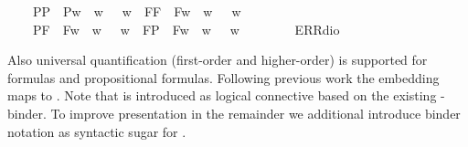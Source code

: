 \begin{isabellebody}
\ \ \ \ {\isacharparenleft}P{\isacharparenleft}{\isasymalpha}{\isacharparenright}{\isacharcomma}P{\isacharparenleft}{\isasymbeta}{\isacharparenright}{\isacharparenright}\ {\isasymRightarrow}\ P{\isacharparenleft}{\isasymlambda}w{\isachardot}\ {\isasymalpha}\ w\ {\isasymlongrightarrow}\ {\isasymbeta}\ w{\isacharparenright}\ {\isacharbar}\ {\isacharparenleft}F{\isacharparenleft}{\isasymalpha}{\isacharparenright}{\isacharcomma}F{\isacharparenleft}{\isasymbeta}{\isacharparenright}{\isacharparenright}\ {\isasymRightarrow}\ F{\isacharparenleft}{\isasymlambda}w{\isachardot}\ {\isasymalpha}\ w\ {\isasymlongrightarrow}\ {\isasymbeta}\ w{\isacharparenright}\ {\isacharbar}\ \isanewline
\ \ \ \ {\isacharparenleft}P{\isacharparenleft}{\isasymalpha}{\isacharparenright}{\isacharcomma}F{\isacharparenleft}{\isasymbeta}{\isacharparenright}{\isacharparenright}\ {\isasymRightarrow}\ F{\isacharparenleft}{\isasymlambda}w{\isachardot}\ {\isasymalpha}\ w\ {\isasymlongrightarrow}\ {\isasymbeta}\ w{\isacharparenright}\ {\isacharbar}\ {\isacharparenleft}F{\isacharparenleft}{\isasymalpha}{\isacharparenright}{\isacharcomma}P{\isacharparenleft}{\isasymbeta}{\isacharparenright}{\isacharparenright}\ {\isasymRightarrow}\ F{\isacharparenleft}{\isasymlambda}w{\isachardot}\ {\isasymalpha}\ w\ {\isasymlongrightarrow}\ {\isasymbeta}\ w{\isacharparenright}\ {\isacharbar}\ \isanewline
\ \ \ \ {\isacharunderscore}\ {\isasymRightarrow}\ ERR{\isacharparenleft}dio{\isacharparenright}{\isachardoublequoteclose}%
\begin{isamarkuptext}%
Also universal quantification  (first-order and higher-order) is supported 
  for formulas  and propositional formulas. Following previous work the embedding maps 
   to . Note that \isa{\isactrlbold {\isasymforall}} is introduced as logical connective
  based on the existing \isa{{\isasymlambda}}-binder. To improve presentation in the remainder we additional
  introduce binder notation  as syntactic sugar for .%
\end{isamarkuptext}%
\isamarkuptrue%
\ \isamarkupfalse%

\end{isabellebody}

